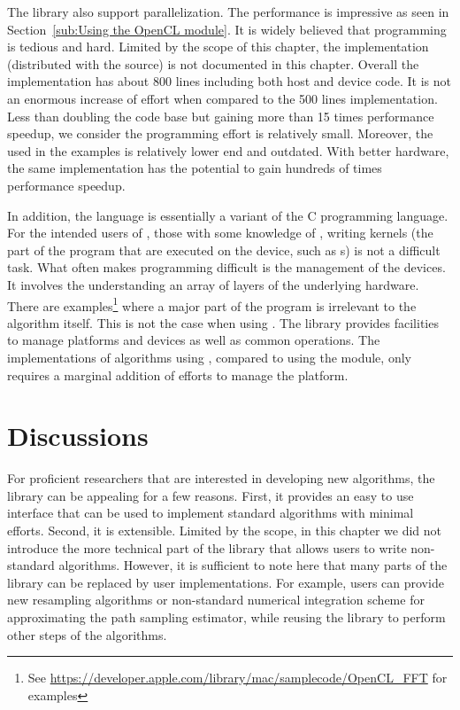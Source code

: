 The library also support \opencl parallelization. The performance is impressive as seen in Section~\ref{sub:Using the OpenCL module}. It is widely believed that \opencl programming is tedious and hard. Limited by the scope of this chapter, the \opencl implementation (distributed with the \vsmc source) is not documented in this chapter. Overall the \opencl implementation has about 800 lines including both host and device code. It is not an enormous increase of effort when compared to the 500 lines \smp implementation. Less than doubling the code base but gaining more than 15 times performance speedup, we consider the programming effort is relatively small. Moreover, the \gpu used in the examples is relatively lower end and outdated. With better hardware, the same implementation has the potential to gain hundreds of times performance speedup.

In addition, the \opencl language is essentially a variant of the C programming language. For the intended users of \vsmc, those with some knowledge of \cpp, writing \opencl kernels (the part of the program that are executed on the device, such as \gpu{}s) is not a difficult task. What often makes \opencl programming difficult is the management of the devices. It involves the understanding an array of layers of the underlying hardware. There are examples\footnote{See \url{https://developer.apple.com/library/mac/samplecode/OpenCL_FFT} for examples} where a major part of the program is irrelevant to the algorithm itself. This is not the case when using \vsmc. The library provides facilities to manage \opencl platforms and devices as well as common operations. The implementations of \smc algorithms using \opencl, compared to using the \smp module, only requires a marginal addition of efforts to manage the \opencl platform.

\section{Discussions}
\label{sec:vSMC Discussion}

For \cpp proficient researchers that are interested in developing new algorithms, the \vsmc library can be appealing for a few reasons. First, it provides an easy to use interface that can be used to implement standard algorithms with minimal efforts. Second, it is extensible. Limited by the scope, in this chapter we did not introduce the more technical part of the library that allows users to write non-standard algorithms. However, it is sufficient to note here that many parts of the library can be replaced by user implementations. For example, users can provide new resampling algorithms or non-standard numerical integration scheme for approximating the path sampling estimator, while reusing the library to perform other steps of the algorithms.

